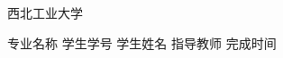 \begin{titlepage}
	\voffset 2.7cm
	\begin{center}
		\begin{center}
			\begin{minipage}[c]{2.64cm}
				\centering
				\resizebox{!}{0.9cm}{ \parbox{0.54cm}{  } }
				\end{minipage}
				\hskip 0.8cm
				\begin{minipage}[c]{8cm}
				\fontsize{33}{33}\fNWPU 西北工业大学
			\end{minipage}
		\end{center}
		\vskip 0.7cm
		\sChuhao{}
		\vskip 5cm
		{
			\sSihao\fSong 专业名称
			\vskip 0.7cm
			\sSihao\fSong 学生学号
			\vskip 0.7cm
			\sSihao\fSong 学生姓名
			\vskip 0.7cm
			\sSihao\fSong 指导教师
			\vskip 0.7cm
			\sSihao\fSong 完成时间
			\vfill
		}
	\end{center}
\end{titlepage}
\fSong \normalsize

\endinput
